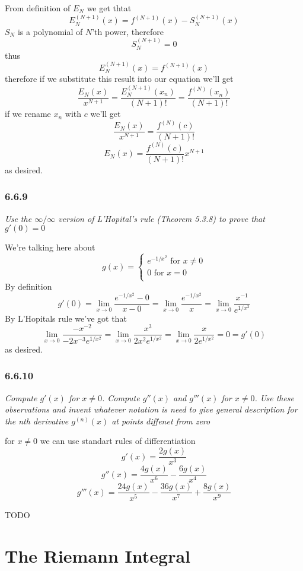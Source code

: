 \documentclass[11pt,oneside,titlepage]{book}
\begin{document}
From definition of $E_N$ we get thtat
$$E_N^{(N + 1)}(x) = f^{(N + 1)}(x) - S_N^{(N + 1)}(x)$$
$S_N$ is a polynomial of $N$'th power, therefore
$$S_N^{(N + 1)} = 0$$
thus
$$E_N^{(N + 1)}(x) = f^{(N + 1)}(x)$$
therefore if we substitute this result into our equation we'll get
$$\frac{E_N(x)}{x^{N + 1}} =
\frac{E_N^{(N + 1)}(x_n)}{(N + 1)!} = \frac{f^{(N)}(x_n)}{(N + 1)!} $$
if we rename $x_n$ with $c$ we'll get 
$$\frac{E_N(x)}{x^{N + 1}} = \frac{f^{(N)}(c)}{(N + 1)!} $$
$$E_N(x) = \frac{f^{(N)}(c)}{(N + 1)!} x^{N + 1}$$
as desired.

\subsection*{6.6.9}
\textit{Use the $\infty/\infty$ version of L'Hopital's rule (Theorem 5.3.8) to
  prove that $g'(0) = 0$}

We're talking here about
$$g(x) =
\begin{cases}
  e^{-1/x^2} \text{ for } x \neq 0 \\
  0 \text{ for } x = 0 \\
\end{cases}
$$
By definition
$$g'(0) = \lim_{x \to 0}{\frac{e^{-1/x^2} - 0}{x - 0}} =
\lim_{x \to 0}{\frac{e^{-1/x^2}}{x}} =
\lim_{x \to 0}{\frac{x^{-1}}{e^{1/x^2}}}$$
By L'Hopitals rule we've got that
$$\lim_{x \to 0}{\frac{- x^{-2}}{-2x^{-3}e^{1/x^2}}} =
\lim_{x \to 0}{\frac{x^{3}}{2x^{2}e^{1/x^2}}} =
\lim_{x \to 0}{\frac{x}{2e^{1/x^2}}} = 0 = g'(0)
$$
as desired.

\subsection*{6.6.10}
\textit{Compute $g'(x)$ for $x \neq 0$. Compute $g''(x)$ and $g'''(x)$ for
  $x \neq 0$. Use these observations and invent whatever notation is need to
  give general description for the nth derivative $g^{(n)}(x)$ at points
  diffenet from zero}

for $x \neq 0$ we can use standart rules of differentiation
$$g'(x) = \frac{2 g(x)}{x^3}$$
$$g''(x) = \frac{4 g(x)}{x^6} - \frac{6 g(x)}{x^4}$$
$$g'''(x) = \frac{24 g(x)}{x^5} - \frac{36 g(x)}{x^7} + \frac{8 g(x)}{x^9}$$

TODO

\chapter{The Riemann Integral}
\end{document}
